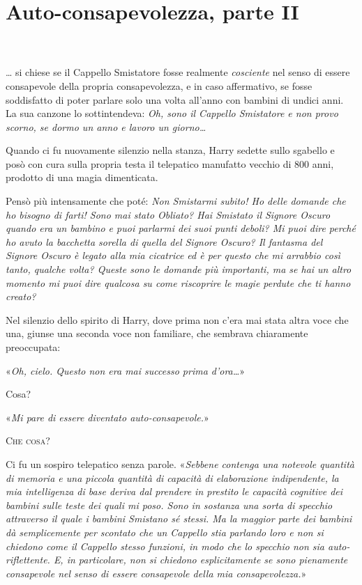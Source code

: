 
\chapter{Auto-consapevolezza, parte II}
\label{capitolo:10}

~\\
~\\

… si chiese se il Cappello Smistatore fosse realmente \textit{cosciente} nel senso di essere consapevole della propria consapevolezza, e in caso affermativo, se fosse soddisfatto di poter parlare solo una volta all’anno con bambini di undici anni. La sua canzone lo sottintendeva: \textit{Oh, sono il Cappello Smistatore e non provo scorno, se dormo un anno e lavoro un giorno…}

Quando ci fu nuovamente silenzio nella stanza, Harry sedette sullo sgabello e posò con cura sulla propria testa il telepatico manufatto vecchio di 800 anni, prodotto di una magia dimenticata.

Pensò più intensamente che poté: \textit{Non Smistarmi subito! Ho delle domande che ho bisogno di farti! Sono mai stato Obliato? Hai Smistato il Signore Oscuro quando era un bambino e puoi parlarmi dei suoi punti deboli? Mi puoi dire perché ho avuto la bacchetta sorella di quella del Signore Oscuro? Il fantasma del Signore Oscuro è legato alla mia cicatrice ed è per questo che mi arrabbio così tanto, qualche volta? Queste sono le domande più importanti, ma se hai un altro momento mi puoi dire qualcosa su come riscoprire le magie perdute che ti hanno creato?}

Nel silenzio dello spirito di Harry, dove prima non c’era mai stata altra voce che una, giunse una seconda voce non familiare, che sembrava chiaramente preoccupata:

«\textit{Oh, cielo. Questo non era mai successo prima d’ora…}»

Cosa?

«\textit{Mi pare di essere diventato auto-consapevole.}»

\textsc{Che cosa?}

Ci fu un sospiro telepatico senza parole. «\textit{Sebbene contenga una notevole quantità di memoria e una piccola quantità di capacità di elaborazione indipendente, la mia intelligenza di base deriva dal prendere in prestito le capacità cognitive dei bambini sulle teste dei quali mi poso. Sono in sostanza una sorta di specchio attraverso il quale i bambini Smistano sé stessi. Ma la maggior parte dei bambini dà semplicemente per scontato che un Cappello stia parlando loro e non si chiedono come il Cappello stesso funzioni, in modo che lo specchio non sia auto-riflettente. E, in particolare, non si chiedono esplicitamente se sono pienamente consapevole nel senso di essere consapevole della mia consapevolezza.}»

